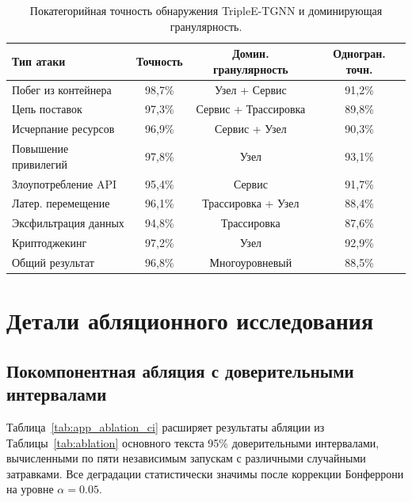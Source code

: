 \begin{table}[htbp]
\centering
\caption{Покатегорийная точность обнаружения TripleE-TGNN и доминирующая гранулярность.}
\label{tab:app_triplee_peratk}
\begin{tabular}{lccc}
\toprule
Тип атаки & Точность & Домин. гранулярность & Одногран. точн. \\
\midrule
Побег из контейнера  & 98,7\% & Узел + Сервис & 91,2\% \\
Цепь поставок        & 97,3\% & Сервис + Трассировка & 89,8\% \\
Исчерпание ресурсов  & 96,9\% & Сервис + Узел & 90,3\% \\
Повышение привилегий & 97,8\% & Узел & 93,1\% \\
Злоупотребление API  & 95,4\% & Сервис & 91,7\% \\
Латер. перемещение   & 96,1\% & Трассировка + Узел & 88,4\% \\
Эксфильтрация данных & 94,8\% & Трассировка & 87,6\% \\
Криптоджекинг        & 97,2\% & Узел & 92,9\% \\
\midrule
Общий результат      & 96,8\% & Многоуровневый & 88,5\% \\
\bottomrule
\end{tabular}
\end{table}


\section{Детали абляционного исследования}
\label{app:ablation_detail}

\subsection{Покомпонентная абляция с доверительными интервалами}
\label{app:component_ablation}

Таблица~\ref{tab:app_ablation_ci} расширяет результаты абляции из Таблицы~\ref{tab:ablation} основного текста 95\% доверительными интервалами, вычисленными по пяти независимым запускам с различными случайными затравками. Все деградации статистически значимы после коррекции Бонферрони на уровне $\alpha=0.05$.

